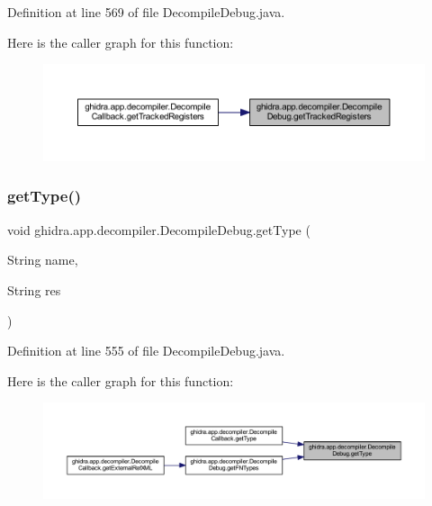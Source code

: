 Definition at line 569 of file Decompile\+Debug.\+java.

Here is the caller graph for this function\+:
\nopagebreak
\begin{figure}[H]
\begin{center}
\leavevmode
\includegraphics[width=350pt]{classghidra_1_1app_1_1decompiler_1_1_decompile_debug_a31db2fa005425108a5cbca58049f48ae_icgraph}
\end{center}
\end{figure}
\mbox{\label{classghidra_1_1app_1_1decompiler_1_1_decompile_debug_aeb72d2bb607448992b312f1b6b8c32b7}} 
\subsubsection{\texorpdfstring{getType()}{getType()}\hspace{0.1cm}{\footnotesize\ttfamily [1/2]}}
{\footnotesize\ttfamily void ghidra.\+app.\+decompiler.\+Decompile\+Debug.\+get\+Type (\begin{DoxyParamCaption}\item[{String}]{name,  }\item[{String}]{res }\end{DoxyParamCaption})\hspace{0.3cm}{\ttfamily [inline]}}



Definition at line 555 of file Decompile\+Debug.\+java.

Here is the caller graph for this function\+:
\nopagebreak
\begin{figure}[H]
\begin{center}
\leavevmode
\includegraphics[width=350pt]{classghidra_1_1app_1_1decompiler_1_1_decompile_debug_aeb72d2bb607448992b312f1b6b8c32b7_icgraph}
\end{center}
\end{figure}
\mbox{\label{classghidra_1_1app_1_1decompiler_1_1_decompile_debug_ad50cd2ada387faea599ecd97f32a6e0c}} 
